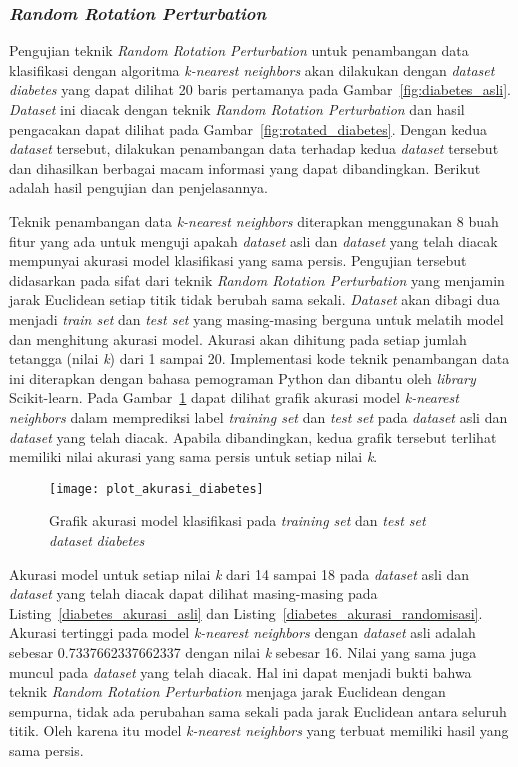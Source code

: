 \subsubsection{\textit{Random Rotation Perturbation}}
\label{subsubsec:pengujian-klasifikasi-rrp}

Pengujian teknik \textit{Random Rotation Perturbation} untuk penambangan data klasifikasi dengan algoritma \textit{k-nearest neighbors} akan dilakukan dengan \textit{dataset} \textit{diabetes} yang dapat dilihat 20 baris pertamanya pada Gambar~\ref{fig:diabetes_asli}. \textit{Dataset} ini diacak dengan teknik \textit{Random Rotation Perturbation} dan hasil pengacakan dapat dilihat pada Gambar~\ref{fig:rotated_diabetes}. Dengan kedua \textit{dataset} tersebut, dilakukan penambangan data terhadap kedua \textit{dataset} tersebut dan dihasilkan berbagai macam informasi yang dapat dibandingkan. Berikut adalah hasil pengujian dan penjelasannya.

Teknik penambangan data \textit{k-nearest neighbors} diterapkan menggunakan 8 buah fitur yang ada untuk menguji apakah \textit{dataset} asli dan \textit{dataset} yang telah diacak mempunyai akurasi model klasifikasi yang sama persis. Pengujian tersebut didasarkan pada sifat dari teknik \textit{Random Rotation Perturbation} yang menjamin jarak Euclidean setiap titik tidak berubah sama sekali. \textit{Dataset} akan dibagi dua menjadi \textit{train set} dan \textit{test set} yang masing-masing berguna untuk melatih model dan menghitung akurasi model. Akurasi akan dihitung pada setiap jumlah tetangga (nilai \textit{k}) dari 1 sampai 20. Implementasi kode teknik penambangan data ini diterapkan dengan bahasa pemograman Python dan dibantu oleh \textit{library} Scikit-learn. Pada Gambar~\ref{fig:plot_akurasi_diabetes} dapat dilihat grafik akurasi model \textit{k-nearest neighbors} dalam memprediksi label \textit{training set} dan \textit{test set} pada \textit{dataset} asli dan \textit{dataset} yang telah diacak. Apabila dibandingkan, kedua grafik tersebut terlihat memiliki nilai akurasi yang sama persis untuk setiap nilai \textit{k}. 

\begin{figure}
	\centering
	\texttt{[image: plot\_akurasi\_diabetes]}
	\caption{Grafik akurasi model klasifikasi pada \textit{training set} dan \textit{test set} \textit{dataset} \textit{diabetes}}
	\label{fig:plot_akurasi_diabetes}
\end{figure}

Akurasi model untuk setiap nilai \textit{k} dari 14 sampai 18 pada \textit{dataset} asli dan \textit{dataset} yang telah diacak dapat dilihat masing-masing pada Listing~\ref{diabetes_akurasi_asli} dan Listing~\ref{diabetes_akurasi_randomisasi}. Akurasi tertinggi pada model \textit{k-nearest neighbors} dengan \textit{dataset} asli adalah sebesar 0.7337662337662337 dengan nilai \textit{k} sebesar 16. Nilai yang sama juga muncul pada \textit{dataset} yang telah diacak. Hal ini dapat menjadi bukti bahwa teknik \textit{Random Rotation Perturbation} menjaga jarak Euclidean dengan sempurna, tidak ada perubahan sama sekali pada jarak Euclidean antara seluruh titik. Oleh karena itu model \textit{k-nearest neighbors} yang terbuat memiliki hasil yang sama persis.

